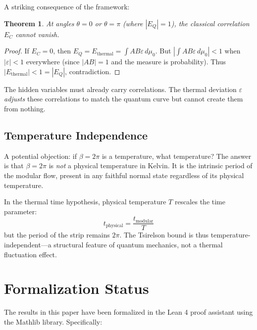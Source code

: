 \documentclass[12pt,a4paper]{article}
\newtheorem{theorem}{Theorem}[section]
\newcommand{\eps}{\varepsilon}
\begin{document}
A striking consequence of the framework:

\begin{theorem}
At angles $\theta = 0$ or $\theta = \pi$ (where $|E_Q| = 1$), the classical correlation $E_C$ cannot vanish.
\end{theorem}

\begin{proof}
If $E_C = 0$, then $E_Q = E_{\text{thermal}} = \int A B \eps \, d\mu_0$. But $|\int AB\eps \, d\mu_0| < 1$ when $|\eps| < 1$ everywhere (since $|AB| = 1$ and the measure is probability). Thus $|E_{\text{thermal}}| < 1 = |E_Q|$, contradiction.
\end{proof}

The hidden variables must already carry correlations. The thermal deviation $\eps$ \emph{adjusts} these correlations to match the quantum curve but cannot create them from nothing.

\subsection{Temperature Independence}

A potential objection: if $\beta = 2\pi$ is a temperature, what temperature? The answer is that $\beta = 2\pi$ is \emph{not} a physical temperature in Kelvin. It is the intrinsic period of the modular flow, present in any faithful normal state regardless of its physical temperature.

In the thermal time hypothesis, physical temperature $T$ rescales the time parameter:
\begin{equation}
t_{\text{physical}} = \frac{t_{\text{modular}}}{T}
\end{equation}
but the period of the strip remains $2\pi$. The Tsirelson bound is thus temperature-independent—a structural feature of quantum mechanics, not a thermal fluctuation effect.

\section{Formalization Status}

The results in this paper have been formalized in the Lean 4 proof assistant using the Mathlib library. Specifically:
\end{document}
